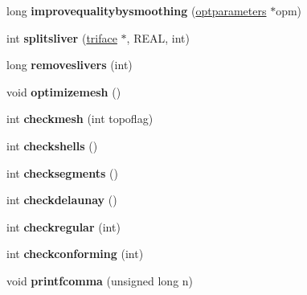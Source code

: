 \begin{DoxyCompactItemize}
\item 
\hypertarget{classtetgenmesh_a1d652618e67ac4ff3057373e15016181}{long {\bfseries improvequalitybysmoothing} (\hyperlink{classtetgenmesh_1_1optparameters}{optparameters} $\ast$opm)}\label{classtetgenmesh_a1d652618e67ac4ff3057373e15016181}

\item 
\hypertarget{classtetgenmesh_aa9540f310c97db99c989a02b0978ceec}{int {\bfseries splitsliver} (\hyperlink{classtetgenmesh_1_1triface}{triface} $\ast$, R\-E\-A\-L, int)}\label{classtetgenmesh_aa9540f310c97db99c989a02b0978ceec}

\item 
\hypertarget{classtetgenmesh_ad5c46c2f6c9adeed23fc8c64b682778d}{long {\bfseries removeslivers} (int)}\label{classtetgenmesh_ad5c46c2f6c9adeed23fc8c64b682778d}

\item 
\hypertarget{classtetgenmesh_a8bb5c6ad8ccfa57f2a84e5a78295b263}{void {\bfseries optimizemesh} ()}\label{classtetgenmesh_a8bb5c6ad8ccfa57f2a84e5a78295b263}

\item 
\hypertarget{classtetgenmesh_ad651dfc786ffccea226a0bf786f94222}{int {\bfseries checkmesh} (int topoflag)}\label{classtetgenmesh_ad651dfc786ffccea226a0bf786f94222}

\item 
\hypertarget{classtetgenmesh_a1db73573a8d3fdfe9da17556b6aacad4}{int {\bfseries checkshells} ()}\label{classtetgenmesh_a1db73573a8d3fdfe9da17556b6aacad4}

\item 
\hypertarget{classtetgenmesh_ae2cbec9eb2c18f23e2046780841c9f6a}{int {\bfseries checksegments} ()}\label{classtetgenmesh_ae2cbec9eb2c18f23e2046780841c9f6a}

\item 
\hypertarget{classtetgenmesh_aa49e45f69ca54da5e57339bb72346a76}{int {\bfseries checkdelaunay} ()}\label{classtetgenmesh_aa49e45f69ca54da5e57339bb72346a76}

\item 
\hypertarget{classtetgenmesh_a4acb9c2400d8d496b0e546f59eb0e9a8}{int {\bfseries checkregular} (int)}\label{classtetgenmesh_a4acb9c2400d8d496b0e546f59eb0e9a8}

\item 
\hypertarget{classtetgenmesh_aa7ff4d59b68391bc6eb4998017a43b77}{int {\bfseries checkconforming} (int)}\label{classtetgenmesh_aa7ff4d59b68391bc6eb4998017a43b77}

\item 
\hypertarget{classtetgenmesh_ae37cd75094463b36d4f1051e7312ca00}{void {\bfseries printfcomma} (unsigned long n)}\label{classtetgenmesh_ae37cd75094463b36d4f1051e7312ca00}


\end{DoxyCompactItemize}

